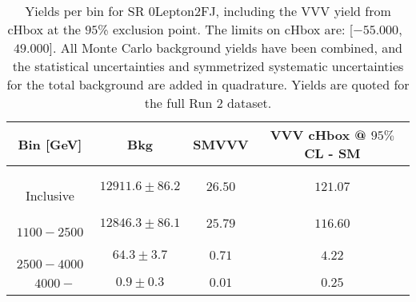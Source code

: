 \begin{table}[!htbp]
    \small
    \center
    \begin{tabular}{c||c|c|c}
    Bin [GeV] & Bkg & SMVVV & \pbox{20cm}{VVV \\ cHbox @ $95\%$ CL - SM \\ }\\
    \hline
    \pbox{20cm}{ ~ \\Inclusive\\ } & $12911.6 \pm 86.2$ & $26.50$ & $121.07$\\
    \hline
    \pbox{20cm}{ ~ \\$1100-2500$\\ } & $12846.3 \pm 86.1$ & $25.79$ & $116.60$\\
    \hline
    \pbox{20cm}{ ~ \\$2500-4000$\\ } & $64.3 \pm 3.7$ & $0.71$ & $4.22$\\
    \hline
    \pbox{20cm}{ ~ \\$4000-$\\ } & $0.9 \pm 0.3$ & $0.01$ & $0.25$\\
\end{tabular}
    \caption{Yields per bin for SR 0Lepton2FJ, including the VVV yield from cHbox at the $95$\% exclusion point. The limits on cHbox are: [$-55.000$,~$49.000$]. All Monte Carlo background yields have been combined, and the statistical uncertainties and symmetrized systematic uncertainties for the total background are added in quadrature. Yields are quoted for the full Run 2 dataset.}
    \label{tab:0Lepton2FJ$binssignal}
\end{table}
